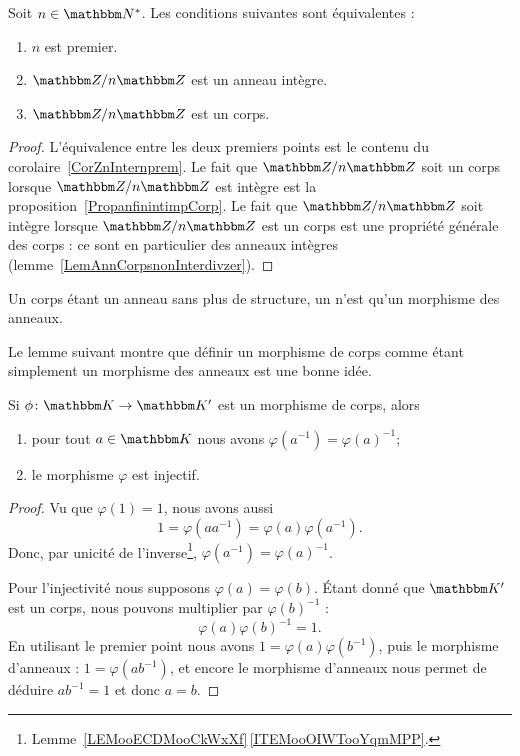\begin{proposition}     \label{PropzhFgNJ}
    Soit \( n\in\eN^*\). Les conditions suivantes sont équivalentes :
    \begin{enumerate}
        \item
            \( n\) est premier.
        \item
            \( \eZ/n\eZ\) est un anneau intègre.
        \item
            \( \eZ/n\eZ\) est un corps.
    \end{enumerate}
\end{proposition}

\begin{proof}
    L'équivalence entre les deux premiers points est le contenu du corolaire~\ref{CorZnInternprem}. Le fait que \( \eZ/n\eZ\) soit un corps lorsque \( \eZ/n\eZ\) est intègre est la proposition~\ref{PropanfinintimpCorp}. Le fait que \( \eZ/n\eZ\) soit intègre lorsque \( \eZ/n\eZ\) est un corps est une propriété générale des corps : ce sont en particulier des anneaux intègres (lemme~\ref{LemAnnCorpsnonInterdivzer}).
\end{proof}

\begin{definition}
    Un corps étant un anneau sans plus de structure, un  n'est qu'un morphisme des anneaux.
\end{definition}

Le lemme suivant montre que définir un morphisme de corps comme étant simplement un morphisme des anneaux est une bonne idée.
\begin{lemma}       \label{LEMooWBOPooZnsZgQ}
    Si \( \phi\colon \eK\to \eK'\) est un morphisme de corps, alors
    \begin{enumerate}
        \item
            pour tout \( a\in \eK\) nous avons \( \varphi(a^{-1})=\varphi(a)^{-1}\);
        \item
            le morphisme \( \varphi\) est injectif.
    \end{enumerate}
\end{lemma}

\begin{proof}
    Vu que \( \varphi(1)=1\), nous avons aussi
    \begin{equation}
        1=\varphi(aa^{-1})=\varphi(a)\varphi(a^{-1}).
    \end{equation}
    Donc, par unicité de l'inverse\footnote{Lemme~\ref{LEMooECDMooCkWxXf}\,\ref{ITEMooOIWTooYqmMPP}.}, \( \varphi(a^{-1})=\varphi(a)^{-1}\).

    Pour l'injectivité nous supposons \( \varphi(a)=\varphi(b)\). Étant donné que \( \eK'\) est un corps, nous pouvons multiplier par \( \varphi(b)^{-1}\) :
    \begin{equation}
        \varphi(a)\varphi(b)^{-1}=1.
    \end{equation}
    En utilisant le premier point nous avons \( 1=\varphi(a)\varphi(b^{-1})\), puis le morphisme d'anneaux : \( 1=\varphi(ab^{-1})\), et encore le morphisme d'anneaux nous permet de déduire \( ab^{-1}=1\) et donc \(a=b\).
\end{proof}


